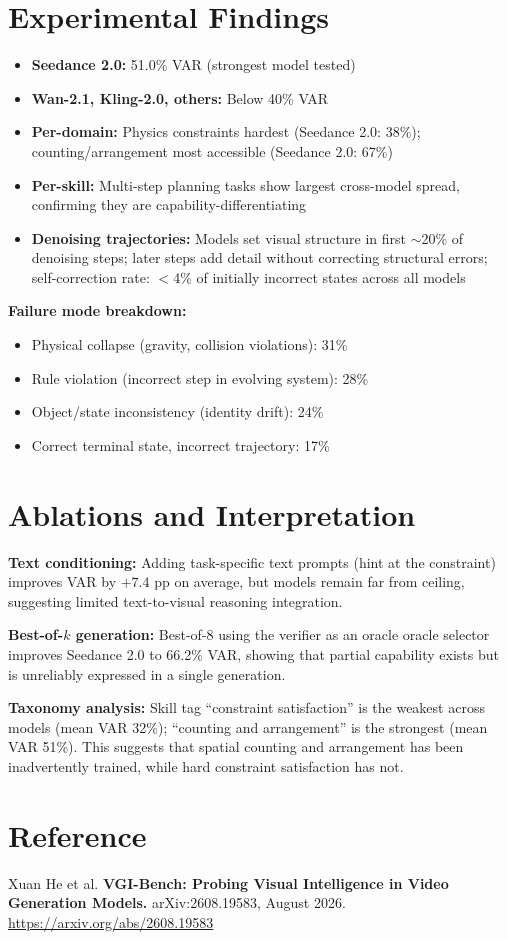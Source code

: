 \documentclass[10pt,twocolumn]{article}
\begin{document}
\section{Experimental Findings}

\begin{itemize}[itemsep=2pt,parsep=0pt]
  \item \textbf{Seedance 2.0:} 51.0\% VAR (strongest model tested)
  \item \textbf{Wan-2.1, Kling-2.0, others:} Below 40\% VAR
  \item \textbf{Per-domain:} Physics constraints hardest
    (Seedance 2.0: 38\%); counting/arrangement most accessible
    (Seedance 2.0: 67\%)
  \item \textbf{Per-skill:} Multi-step planning tasks show largest
    cross-model spread, confirming they are capability-differentiating
  \item \textbf{Denoising trajectories:} Models set visual structure
    in first $\sim$20\% of denoising steps; later steps add detail
    without correcting structural errors; self-correction rate: $<$4\%
    of initially incorrect states across all models
\end{itemize}

\textbf{Failure mode breakdown:}
\begin{itemize}[itemsep=2pt,parsep=0pt]
  \item Physical collapse (gravity, collision violations): 31\%
  \item Rule violation (incorrect step in evolving system): 28\%
  \item Object/state inconsistency (identity drift): 24\%
  \item Correct terminal state, incorrect trajectory: 17\%
\end{itemize}

\section{Ablations and Interpretation}

\textbf{Text conditioning:} Adding task-specific text prompts (hint
at the constraint) improves VAR by $+7.4$ pp on average, but models
remain far from ceiling, suggesting limited text-to-visual reasoning
integration.

\textbf{Best-of-$k$ generation:} Best-of-8 using the verifier as an
oracle oracle selector improves Seedance 2.0 to 66.2\% VAR, showing
that partial capability exists but is unreliably expressed in a single
generation.

\textbf{Taxonomy analysis:} Skill tag ``constraint satisfaction''
is the weakest across models (mean VAR 32\%); ``counting and arrangement''
is the strongest (mean VAR 51\%). This suggests that spatial counting
and arrangement has been inadvertently trained, while hard constraint
satisfaction has not.

\section*{Reference}

Xuan He et al.
\textbf{VGI-Bench: Probing Visual Intelligence in Video
Generation Models.}
arXiv:2608.19583, August 2026.
\url{https://arxiv.org/abs/2608.19583}
\end{document}
